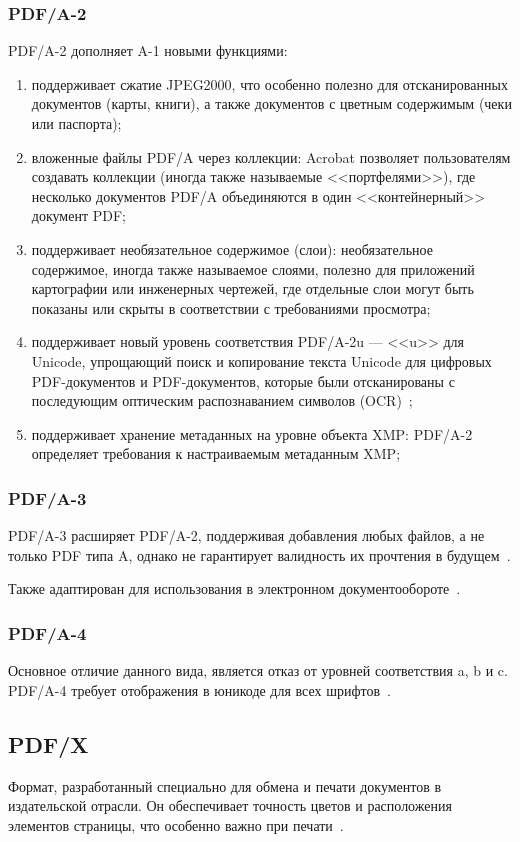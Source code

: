 \subsubsection{PDF/A-2}
PDF/A-2 дополняет A-1 новыми функциями:
\begin{enumerate}
	\item поддерживает сжатие JPEG2000, что особенно полезно для отсканированных документов (карты, книги), а также документов с цветным содержимым (чеки или паспорта);
	\item вложенные файлы PDF/A через коллекции: Acrobat позволяет пользователям создавать коллекции (иногда также называемые <<портфелями>>), где несколько документов PDF/A объединяются в один <<контейнерный>> документ PDF;
	
	\item поддерживает необязательное содержимое (слои): необязательное содержимое, иногда также называемое слоями, полезно для приложений картографии или инженерных чертежей, где отдельные слои могут быть показаны или скрыты в соответствии с требованиями просмотра;
	\item поддерживает новый уровень соответствия PDF/A-2u --- <<u>> для Unicode, упрощающий поиск и копирование текста Unicode для цифровых PDF-документов и PDF-документов, которые были отсканированы с последующим оптическим распознаванием символов (OCR)~\cite{pdf_a_2};
	
	\item поддерживает хранение метаданных на уровне объекта XMP: PDF/A-2 определяет требования к настраиваемым метаданным XMP;
	
\end{enumerate}
\subsubsection{PDF/A-3}
PDF/A-3 расширяет PDF/A-2, поддерживая добавления любых файлов, а не только PDF типа A, однако не гарантирует валидность их прочтения в будущем~\cite{pdf_a_2}.

Также адаптирован для использования в электронном документообороте~\cite{nalogi}.
\subsubsection{PDF/A-4}
Основное отличие данного вида, является отказ от уровней соответствия a, b и c. PDF/A-4 требует отображения в юникоде для всех шрифтов~\cite{pdf_a_4}.

\subsection{PDF/X}
Формат, разработанный специально для обмена и печати документов в издательской отрасли. Он обеспечивает точность цветов и расположения элементов страницы, что особенно важно при печати~\cite{abdobe_PDF}.


